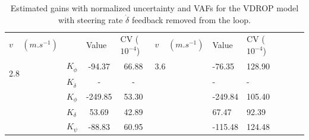 \begin{table}[]
    \caption{Estimated gains with normalized uncertainty and VAFs for the VDROP model with steering rate \ensuremath{\dot{\delta}} feedback removed from the loop. }
    \centering
    \begin{tabular}{llcc|llllll}
    \multirow{2}{*}{$v \;\;\;\;(\si{m.s^{-1}})$} &                       & \multicolumn{1}{l}{\multirow{2}{*}{Value}} & \multicolumn{1}{l|}{\multirow{2}{*}{CV ($10^{-4}$)}} & \multirow{2}{*}{$v \;\;\;\;(\si{m.s^{-1}})$} & \multirow{2}{*}{Value} & \multirow{2}{*}{CV ($10^{-4}$)} &  &  &  \\
                                                 &                       & \multicolumn{1}{l}{}                       & \multicolumn{1}{l|}{}                                &                                              &                        &                                 &  &  &  \\ \cline{1-7}
    \multirow{2}{*}{2.8}                         & $K_{\dot{\phi}} $     & -94.37                                     & 66.88                                                & 3.6                                          & -76.35                 & 128.90                          &  &  &  \\
                                                 & $K_{\dot{\delta}}$    & -                                          & -                                                    &                                              & -                      & -                               &  &  &  \\
                                                 & $K_{\phi} $           & -249.85                                    & 53.30                                                &                                              & -249.84                & 105.40                          &  &  &  \\
                                                 & $K_\delta $           & 53.69                                      & 42.89                                                &                                              & 67.47                  & 92.39                           &  &  &  \\
                                                 & $K_\psi $             & -88.83                                     & 60.95                                                &                                              & -115.48                & 124.48                          &  &  &  \\

\end{tabular}
\end{table}

